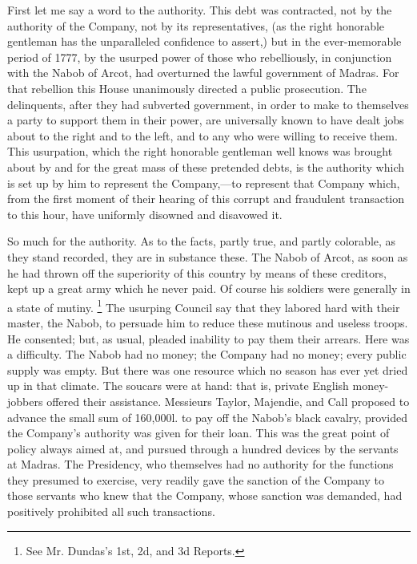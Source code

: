 First let me say a word to the authority. This debt was contracted, not by the authority of the Company, not by its representatives, (as the right honorable gentleman has the unparalleled confidence to assert,) but in the ever-memorable period of 1777, by the usurped power of those who rebelliously, in conjunction with the Nabob of Arcot, had overturned the lawful government of Madras. For that rebellion this House unanimously directed a public prosecution. The delinquents, after they had subverted government, in order to make to themselves a party to support them in their power, are universally known to have dealt jobs about to the right and to the left, and to any who were willing to receive them. This usurpation, which the right honorable gentleman well knows was brought about by and for the great mass of these pretended debts, is the authority which is set up by him to represent the Company,—to represent that Company which, from the first moment of their hearing of this corrupt and fraudulent transaction to this hour, have uniformly disowned and disavowed it.

So much for the authority. As to the facts, partly true, and partly colorable, as they stand recorded, they are in substance these. The Nabob of Arcot, as soon as he had thrown off the superiority of this country by means of these creditors, kept up a great army which he never paid. Of course his soldiers were generally in a state of mutiny.
\footnote{ See Mr. Dundas's 1st, 2d, and 3d Reports.}
 The usurping Council say that they labored hard with their master, the Nabob, to persuade him to reduce these mutinous and useless troops. He consented; but, as usual, pleaded inability to pay them their arrears. Here was a difficulty. The Nabob had no money; the Company had no money; every public supply was empty. But there was one resource which no season has ever yet dried up in that climate. The soucars were at hand: that is, private English money-jobbers offered their assistance. Messieurs Taylor, Majendie, and Call proposed to advance the small sum of 160,000l. to pay off the Nabob's black cavalry, provided the Company's authority was given for their loan. This was the great point of policy always aimed at, and pursued through a hundred devices by the servants at Madras. The Presidency, who themselves had no authority for the functions they presumed to exercise, very readily gave the sanction of the Company to those servants who knew that the Company, whose sanction was demanded, had positively prohibited all such transactions.

